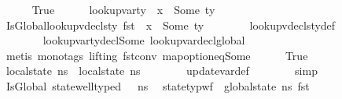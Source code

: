 \begin{isabellebody}
\ \ \ \ \isamarkupfalse%
\ True\isanewline
\ \ \ \ \isamarkupfalse%
\ {\isacartoucheopen}lookup{\isacharunderscore}{\kern0pt}var{\isacharunderscore}{\kern0pt}ty\ {\isasymLambda}\ x\ {\isacharequal}{\kern0pt}\ Some\ ty{\isacartoucheclose}\ \isamarkupfalse%
\ IsGlobal{\isacharcolon}{\kern0pt}{\isachardoublequoteopen}lookup{\isacharunderscore}{\kern0pt}vdecls{\isacharunderscore}{\kern0pt}ty\ {\isacharparenleft}{\kern0pt}fst\ {\isasymLambda}{\isacharparenright}{\kern0pt}\ x\ {\isacharequal}{\kern0pt}\ Some\ ty{\isachardoublequoteclose}\isanewline
\ \ \ \ \ \ \isamarkupfalse%
\ lookup{\isacharunderscore}{\kern0pt}vdecls{\isacharunderscore}{\kern0pt}ty{\isacharunderscore}{\kern0pt}def\ \ \ \ \ \ \ \isanewline
\ \ \ \ \ \ \isamarkupfalse%
\ lookup{\isacharunderscore}{\kern0pt}var{\isacharunderscore}{\kern0pt}ty{\isacharunderscore}{\kern0pt}decl{\isacharunderscore}{\kern0pt}Some\ lookup{\isacharunderscore}{\kern0pt}var{\isacharunderscore}{\kern0pt}decl{\isacharunderscore}{\kern0pt}global{\isacharunderscore}{\kern0pt}{}\isanewline
\ \ \ \ \ \ \isamarkupfalse%
\ {\isacharparenleft}{\kern0pt}metis\ {\isacharparenleft}{\kern0pt}mono{\isacharunderscore}{\kern0pt}tags{\isacharcomma}{\kern0pt}\ lifting{\isacharparenright}{\kern0pt}\ fst{\isacharunderscore}{\kern0pt}conv\ map{\isacharunderscore}{\kern0pt}option{\isacharunderscore}{\kern0pt}eq{\isacharunderscore}{\kern0pt}Some{\isacharparenright}{\kern0pt}\isanewline
\ \ \ \ \isamarkupfalse%
\ True\ \isamarkupfalse%
\ {\isachardoublequoteopen}local{\isacharunderscore}{\kern0pt}state\ {\isacharquery}{\kern0pt}ns{\isacharprime}{\kern0pt}\ {\isacharequal}{\kern0pt}\ local{\isacharunderscore}{\kern0pt}state\ ns{\isachardoublequoteclose}\isanewline
\ \ \ \ \ \ \isamarkupfalse%
\ update{\isacharunderscore}{\kern0pt}var{\isacharunderscore}{\kern0pt}def\isanewline
\ \ \ \ \ \ \isamarkupfalse%
\ simp\isanewline
\ \ \ \ \isamarkupfalse%
\ \isamarkupfalse%
\ IsGlobal\ {\isacartoucheopen}state{\isacharunderscore}{\kern0pt}well{\isacharunderscore}{\kern0pt}typed\ {\isasymLambda}\ {\isasymOmega}\ ns{\isacartoucheclose}\ \isamarkupfalse%
\ {\isachardoublequoteopen}state{\isacharunderscore}{\kern0pt}typ{\isacharunderscore}{\kern0pt}wf\ {\isasymOmega}\ {\isacharparenleft}{\kern0pt}global{\isacharunderscore}{\kern0pt}state\ {\isacharquery}{\kern0pt}ns{\isacharprime}{\kern0pt}{\isacharparenright}{\kern0pt}\ {\isacharparenleft}{\kern0pt}fst\ {\isasymLambda}{\isacharparenright}{\kern0pt}{\isachardoublequoteclose}\isanewline

\end{isabellebody}
